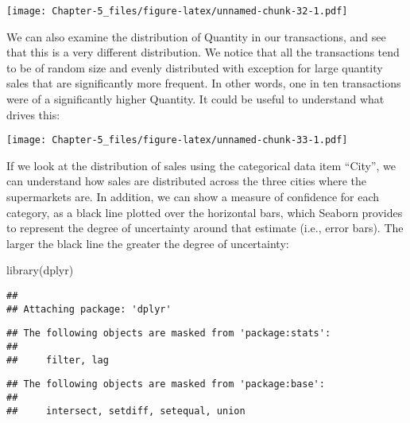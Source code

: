 \documentclass[
]{article}
\newenvironment{Shaded}{\begin{snugshade}}{\end{snugshade}}
\newcommand{\AttributeTok}[1]{\textcolor[rgb]{0.77,0.63,0.00}{#1}}
\newcommand{\DecValTok}[1]{\textcolor[rgb]{0.00,0.00,0.81}{#1}}
\newcommand{\FunctionTok}[1]{\textcolor[rgb]{0.00,0.00,0.00}{#1}}
\newcommand{\NormalTok}[1]{#1}
\newcommand{\SpecialCharTok}[1]{\textcolor[rgb]{0.00,0.00,0.00}{#1}}
\newcommand{\StringTok}[1]{\textcolor[rgb]{0.31,0.60,0.02}{#1}}
\begin{document}
\texttt{[image: Chapter-5\_files/figure-latex/unnamed-chunk-32-1.pdf]}

We can also examine the distribution of Quantity in our transactions,
and see that this is a very different distribution. We notice that all
the transactions tend to be of random size and evenly distributed with
exception for large quantity sales that are significantly more frequent.
In other words, one in ten transactions were of a significantly higher
Quantity. It could be useful to understand what drives this:

\begin{Shaded}
\end{Shaded}

\texttt{[image: Chapter-5\_files/figure-latex/unnamed-chunk-33-1.pdf]}

If we look at the distribution of sales using the categorical data item
``City'', we can understand how sales are distributed across the three
cities where the supermarkets are. In addition, we can show a measure of
confidence for each category, as a black line plotted over the
horizontal bars, which Seaborn provides to represent the degree of
uncertainty around that estimate (i.e., error bars). The larger the
black line the greater the degree of uncertainty:

\begin{Shaded}
\begin{Highlighting}[]
\FunctionTok{library}\NormalTok{(dplyr)}
\end{Highlighting}
\end{Shaded}

\begin{verbatim}
## 
## Attaching package: 'dplyr'
\end{verbatim}

\begin{verbatim}
## The following objects are masked from 'package:stats':
## 
##     filter, lag
\end{verbatim}

\begin{verbatim}
## The following objects are masked from 'package:base':
## 
##     intersect, setdiff, setequal, union
\end{verbatim}
\end{document}
